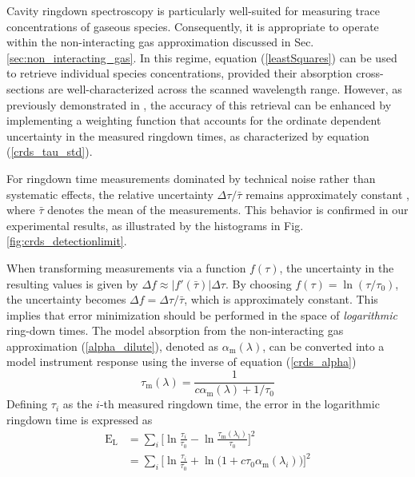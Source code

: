 \documentclass[12pt]{report}
\begin{document}
	Cavity ringdown spectroscopy is particularly well-suited for measuring trace concentrations of gaseous species. Consequently, it is appropriate to operate within the non-interacting gas approximation discussed in Sec. \ref{sec:non_interacting_gas}. In this regime, equation (\ref{leastSquares}) can be used to retrieve individual species concentrations, provided their absorption cross-sections are well-characterized across the scanned wavelength range. However, as previously demonstrated in \cite{mine_acetone}, the accuracy of this retrieval can be enhanced by implementing a weighting function that accounts for the ordinate dependent uncertainty in the measured ringdown times, as characterized by equation (\ref{crds_tau_std}).
	
	
	For ringdown time measurements dominated by technical noise rather than systematic effects, the relative uncertainty $\Delta\tau/\bar{\tau}$ remains approximately constant \cite{vanZee_1999}, where $\bar{\tau}$ denotes the mean of the measurements. This behavior is confirmed in our experimental results, as illustrated by the histograms in Fig. \ref{fig:crds_detectionlimit}.
	
	When transforming measurements via a function $f(\tau)$, the uncertainty in the resulting values is given by $\Delta f \approx |f'(\bar{\tau})| \Delta \tau$. By choosing $f(\tau) = \ln(\tau/\tau_0)$, the uncertainty becomes $\Delta f = \Delta \tau/\bar{\tau}$, which is approximately constant. This implies that error minimization should be performed in the space of \textit{logarithmic} ring-down times. The model absorption from the non-interacting gas approximation (\ref{alpha_dilute}), denoted as $\alpha_\mathrm{m}(\lambda)$, can be converted into a model instrument response using the inverse of equation (\ref{crds_alpha})
	\begin{equation}
		\tau_\mathrm{m}(\lambda) = \frac{1}{c\alpha_\mathrm{m}(\lambda) + 1/\tau_0}
	\end{equation}
	Defining $\tau_i$ as the $i$-th measured ringdown time, the error in the logarithmic ringdown time is expressed as
	\begin{align} %
		\mathrm{E}_\mathrm{L} &= \sum_i \Big[\ln \frac{\tau_i}{\tau_0} - \ln\frac{\tau_\mathrm{m}(\lambda_i)}{\tau_0}\Big]^2 \nonumber \\
		&= \sum_i \Big[\ln \frac{\tau_i}{\tau_0} + \ln\big(1+c\tau_0\alpha_\mathrm{m}(\lambda_i)\big)\Big]^2
	\end{align}
		
\end{document}
